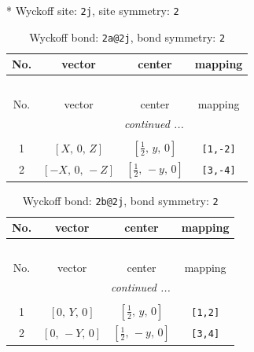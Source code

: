 \documentclass[fleqn,8pt]{jsarticle}
\begin{document}
* Wyckoff site: {\tt 2j}, site symmetry: {\tt 2}
\renewcommand{\arraystretch}{1.2}
\begin{longtable}{cccc}
\caption{Wyckoff bond: {\tt 2a@2j}, bond symmetry: {\tt 2}}
 \\
 \hline \hline
No. & vector & center & mapping \\ \hline \endfirsthead

\multicolumn{3}{l}{\tablename\ \thetable{}} \\
 \hline \hline
No. & vector & center & mapping \\ \hline \endhead

 \hline \hline
\multicolumn{3}{r}{\footnotesize\it continued ...} \\ \endfoot

 \hline \hline
\multicolumn{3}{r}{} \\ \endlastfoot

1 & $\left[ X,\, 0,\, Z \right]$ & $\left[ \frac{1}{2},\, y,\, 0 \right]$ & {\tt [1,-2]} \\ \hline
2 & $\left[ - X,\, 0,\, - Z \right]$ & $\left[ \frac{1}{2},\, - y,\, 0 \right]$ & {\tt [3,-4]} \\
\end{longtable}
\renewcommand{\arraystretch}{1.2}
\begin{longtable}{cccc}
\caption{Wyckoff bond: {\tt 2b@2j}, bond symmetry: {\tt 2}}
 \\
 \hline \hline
No. & vector & center & mapping \\ \hline \endfirsthead

\multicolumn{3}{l}{\tablename\ \thetable{}} \\
 \hline \hline
No. & vector & center & mapping \\ \hline \endhead

 \hline \hline
\multicolumn{3}{r}{\footnotesize\it continued ...} \\ \endfoot

 \hline \hline
\multicolumn{3}{r}{} \\ \endlastfoot

1 & $\left[ 0,\, Y,\, 0 \right]$ & $\left[ \frac{1}{2},\, y,\, 0 \right]$ & {\tt [1,2]} \\ \hline
2 & $\left[ 0,\, - Y,\, 0 \right]$ & $\left[ \frac{1}{2},\, - y,\, 0 \right]$ & {\tt [3,4]} \\
\end{longtable}
\renewcommand{\arraystretch}{1.2}
\end{document}
